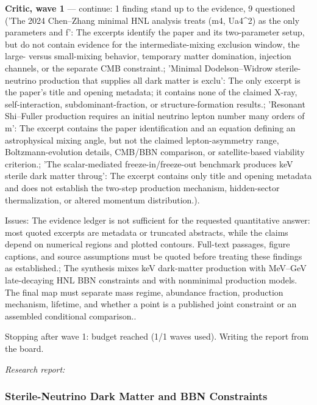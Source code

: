 \documentclass[11pt,a4paper]{article}
\begin{document}
\textbf{Critic, wave 1} --- continue: 1 finding stand up to the evidence, 9 questioned ('The 2024 Chen--Zhang minimal HNL analysis treats (m4, \textbar{}Ua4\textbar{}\textasciicircum{}2) as the only parameters and f': The excerpts identify the paper and its two-parameter setup, but do not contain evidence for the intermediate-mixing exclusion window, the large- versus small-mixing behavior, temporary matter domination, injection channels, or the separate CMB constraint.; 'Minimal Dodelson--Widrow sterile-neutrino production that supplies all dark matter is exclu': The only excerpt is the paper's title and opening metadata; it contains none of the claimed X-ray, self-interaction, subdominant-fraction, or structure-formation results.; 'Resonant Shi--Fuller production requires an initial neutrino lepton number many orders of m': The excerpt contains the paper identification and an equation defining an astrophysical mixing angle, but not the claimed lepton-asymmetry range, Boltzmann-evolution details, CMB/BBN comparison, or satellite-based viability criterion.; 'The scalar-mediated freeze-in/freeze-out benchmark produces keV sterile dark matter throug': The excerpt contains only title and opening metadata and does not establish the two-step production mechanism, hidden-sector thermalization, or altered momentum distribution.).

Issues: The evidence ledger is not sufficient for the requested quantitative answer: most quoted excerpts are metadata or truncated abstracts, while the claims depend on numerical regions and plotted contours. Full-text passages, figure captions, and source assumptions must be quoted before treating these findings as established.; The synthesis mixes keV dark-matter production with MeV--GeV late-decaying HNL BBN constraints and with nonminimal production models. The final map must separate mass regime, abundance fraction, production mechanism, lifetime, and whether a point is a published joint constraint or an assembled conditional comparison..

Stopping after wave 1: budget reached (1/1 waves used). Writing the report from the board.

\textit{Research report:}\par
\subsubsection*{Sterile-Neutrino Dark Matter and BBN Constraints}
\end{document}

